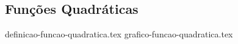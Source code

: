 \subsection{Funções Quadráticas}
\label{sec:funcoes-quadraticas}

{definicao-funcao-quadratica.tex}
{grafico-funcao-quadratica.tex}
